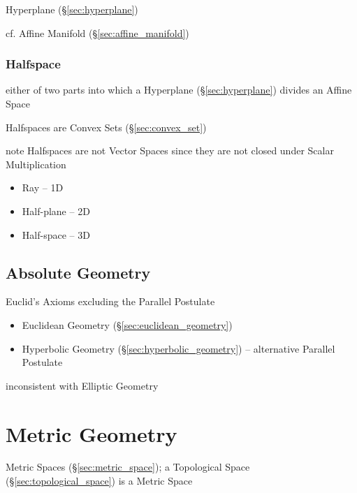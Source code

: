 Hyperplane (\S\ref{sec:hyperplane})

cf. Affine Manifold (\S\ref{sec:affine_manifold})



\subsubsection{Halfspace}\label{sec:halfspace}

either of two parts into which a Hyperplane (\S\ref{sec:hyperplane}) divides an
Affine Space

Halfspaces are Convex Sets (\S\ref{sec:convex_set})

note Halfspaces are not Vector Spaces since they are not closed under Scalar
Multiplication

\begin{itemize}
  \item Ray -- 1D
  \item Half-plane -- 2D
  \item Half-space -- 3D
\end{itemize}



\subsection{Absolute Geometry}\label{sec:absolute_geometry}

Euclid's Axioms excluding the Parallel Postulate

\begin{itemize}
  \item Euclidean Geometry (\S\ref{sec:euclidean_geometry})
  \item Hyperbolic Geometry (\S\ref{sec:hyperbolic_geometry}) -- alternative
    Parallel Postulate
\end{itemize}

inconsistent with Elliptic Geometry



\section{Metric Geometry}\label{sec:metric_geometry}

Metric Spaces (\S\ref{sec:metric_space}); a Topological Space
(\S\ref{sec:topological_space}) is a Metric Space



